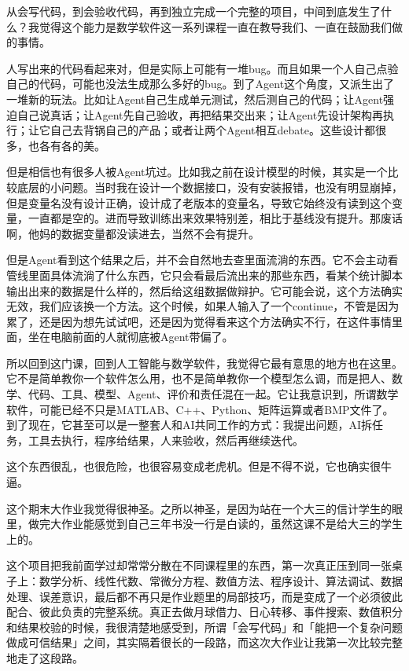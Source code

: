 从会写代码，到会验收代码，再到独立完成一个完整的项目，中间到底发生了什么？我觉得这个能力是数学软件这一系列课程一直在教导我们、一直在鼓励我们做的事情。

人写出来的代码看起来对，但是实际上可能有一堆bug。而且如果一个人自己点验自己的代码，可能也没法生成那么多好的bug。到了Agent这个角度，又派生出了一堆新的玩法。比如让Agent自己生成单元测试，然后测自己的代码；让Agent强迫自己说真话；让Agent先自己验收，再把结果交出来；让Agent先设计架构再执行；让它自己去背锅自己的产品；或者让两个Agent相互debate。这些设计都很多，也各有各的美。

但是相信也有很多人被Agent坑过。比如我之前在设计模型的时候，其实是一个比较底层的小问题。当时我在设计一个数据接口，没有安装报错，也没有明显崩掉，但是变量名没有设计正确，设计成了老版本的变量名，导致它始终没有读到这个变量，一直都是空的。进而导致训练出来效果特别差，相比于基线没有提升。那废话啊，他妈的数据变量都没读进去，当然不会有提升。

但是Agent看到这个结果之后，并不会自然地去查里面流淌的东西。它不会主动看管线里面具体流淌了什么东西，它只会看最后流出来的那些东西，看某个统计脚本输出出来的数据是什么样的，然后给这组数据做辩护。它可能会说，这个方法确实无效，我们应该换一个方法。这个时候，如果人输入了一个continue，不管是因为累了，还是因为想先试试吧，还是因为觉得看来这个方法确实不行，在这件事情里面，坐在电脑前面的人就彻底被Agent带偏了。

所以回到这门课，回到人工智能与数学软件，我觉得它最有意思的地方也在这里。它不是简单教你一个软件怎么用，也不是简单教你一个模型怎么调，而是把人、数学、代码、工具、模型、Agent、评价和责任混在一起。它让我意识到，所谓数学软件，可能已经不只是MATLAB、C++、Python、矩阵运算或者BMP文件了。到了现在，它甚至可以是一整套人和AI共同工作的方式：我提出问题，AI拆任务，工具去执行，程序给结果，人来验收，然后再继续迭代。

这个东西很乱，也很危险，也很容易变成老虎机。但是不得不说，它也确实很牛逼。

这个期末大作业我觉得很神圣。之所以神圣，是因为站在一个大三的信计学生的眼里，做完大作业能感觉到自己三年书没一行是白读的，虽然这课不是给大三的学生上的。

这个项目把我前面学过却常常分散在不同课程里的东西，第一次真正压到同一张桌子上：数学分析、线性代数、常微分方程、数值方法、程序设计、算法调试、数据处理、误差意识，最后都不再只是作业题里的局部技巧，而是变成了一个必须彼此配合、彼此负责的完整系统。真正去做月球借力、日心转移、事件搜索、数值积分和结果校验的时候，我很清楚地感受到，所谓「会写代码」和「能把一个复杂问题做成可信结果」之间，其实隔着很长的一段路，而这次大作业让我第一次比较完整地走了这段路。

